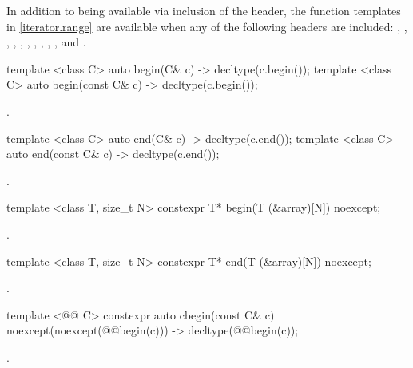 {\color{oldoldclr}
\pnum
In addition to being available via inclusion of the  header,
the function templates in \ref{iterator.range} are available when any of the following
headers are included: , , ,
, , , , ,
, , and .
}

{\color{oldoldclr}
%
\begin{itemdecl}
template <class C> auto begin(C& c) -> decltype(c.begin());
template <class C> auto begin(const C& c) -> decltype(c.begin());
\end{itemdecl}

\begin{itemdescr}
\pnum
\returns {}.
\end{itemdescr}

%
\begin{itemdecl}
template <class C> auto end(C& c) -> decltype(c.end());
template <class C> auto end(const C& c) -> decltype(c.end());
\end{itemdecl}

\begin{itemdescr}
\pnum
\returns {}.
\end{itemdescr}

%
\begin{itemdecl}
template <class T, size_t N> constexpr T* begin(T (&array)[N]) noexcept;
\end{itemdecl}

\begin{itemdescr}
\pnum
\returns {}.
\end{itemdescr}

%
\begin{itemdecl}
template <class T, size_t N> constexpr T* end(T (&array)[N]) noexcept;
\end{itemdecl}

\begin{itemdescr}
\pnum
\returns {}.
\end{itemdescr}
}

%
\begin{itemdecl}
template <@@ C> constexpr auto cbegin(const C& c) noexcept(noexcept(@@begin(c)))
  -> decltype(@@begin(c));
\end{itemdecl}
\begin{itemdescr}
\pnum \returns {}.
\end{itemdescr}

